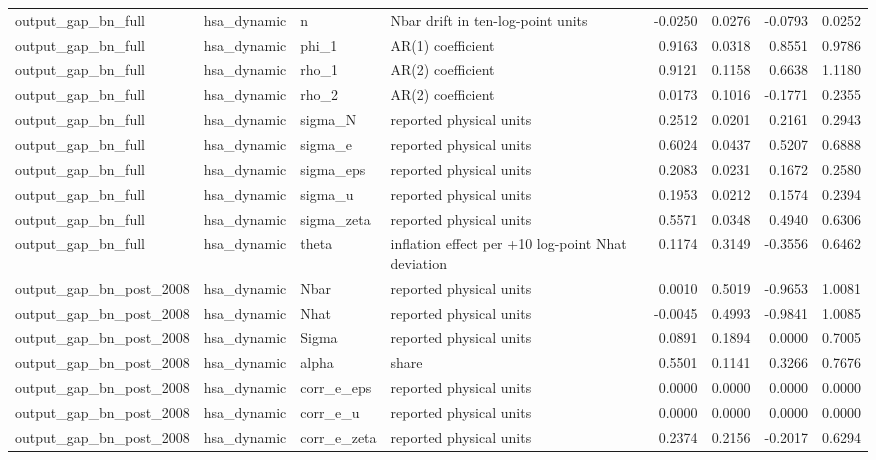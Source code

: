 \begin{tabular}{llllrrrr}
output\_gap\_bn\_full & hsa\_dynamic & n & Nbar drift in ten-log-point units & -0.0250 & 0.0276 & -0.0793 & 0.0252 \\
output\_gap\_bn\_full & hsa\_dynamic & phi\_1 & AR(1) coefficient & 0.9163 & 0.0318 & 0.8551 & 0.9786 \\
output\_gap\_bn\_full & hsa\_dynamic & rho\_1 & AR(2) coefficient & 0.9121 & 0.1158 & 0.6638 & 1.1180 \\
output\_gap\_bn\_full & hsa\_dynamic & rho\_2 & AR(2) coefficient & 0.0173 & 0.1016 & -0.1771 & 0.2355 \\
output\_gap\_bn\_full & hsa\_dynamic & sigma\_N & reported physical units & 0.2512 & 0.0201 & 0.2161 & 0.2943 \\
output\_gap\_bn\_full & hsa\_dynamic & sigma\_e & reported physical units & 0.6024 & 0.0437 & 0.5207 & 0.6888 \\
output\_gap\_bn\_full & hsa\_dynamic & sigma\_eps & reported physical units & 0.2083 & 0.0231 & 0.1672 & 0.2580 \\
output\_gap\_bn\_full & hsa\_dynamic & sigma\_u & reported physical units & 0.1953 & 0.0212 & 0.1574 & 0.2394 \\
output\_gap\_bn\_full & hsa\_dynamic & sigma\_zeta & reported physical units & 0.5571 & 0.0348 & 0.4940 & 0.6306 \\
output\_gap\_bn\_full & hsa\_dynamic & theta & inflation effect per +10 log-point Nhat deviation & 0.1174 & 0.3149 & -0.3556 & 0.6462 \\
output\_gap\_bn\_post\_2008 & hsa\_dynamic & Nbar & reported physical units & 0.0010 & 0.5019 & -0.9653 & 1.0081 \\
output\_gap\_bn\_post\_2008 & hsa\_dynamic & Nhat & reported physical units & -0.0045 & 0.4993 & -0.9841 & 1.0085 \\
output\_gap\_bn\_post\_2008 & hsa\_dynamic & Sigma & reported physical units & 0.0891 & 0.1894 & 0.0000 & 0.7005 \\
output\_gap\_bn\_post\_2008 & hsa\_dynamic & alpha & share & 0.5501 & 0.1141 & 0.3266 & 0.7676 \\
output\_gap\_bn\_post\_2008 & hsa\_dynamic & corr\_e\_eps & reported physical units & 0.0000 & 0.0000 & 0.0000 & 0.0000 \\
output\_gap\_bn\_post\_2008 & hsa\_dynamic & corr\_e\_u & reported physical units & 0.0000 & 0.0000 & 0.0000 & 0.0000 \\
output\_gap\_bn\_post\_2008 & hsa\_dynamic & corr\_e\_zeta & reported physical units & 0.2374 & 0.2156 & -0.2017 & 0.6294 \\

\end{tabular}
